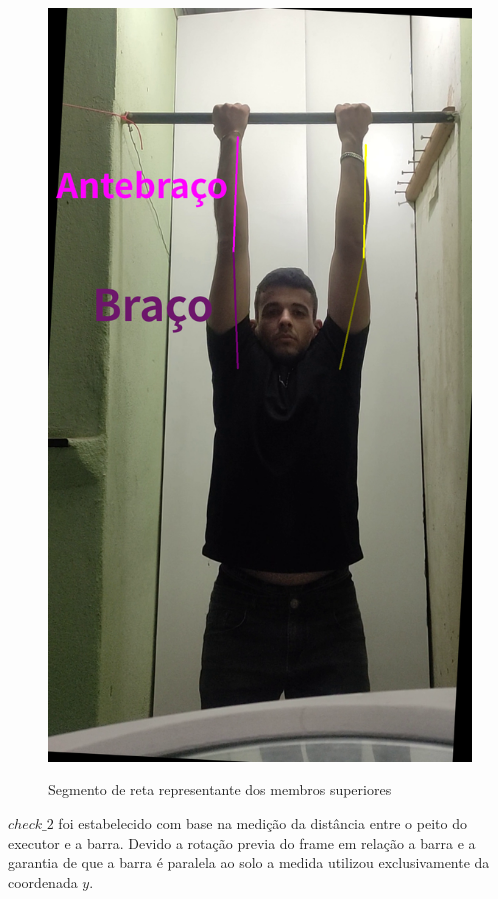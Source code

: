 \begin{figure}[H]
	\centering
    \caption{Segmento de reta representante dos membros superiores}
	\includegraphics[scale=0.2]{figuras/braco_esticado/82_braco_antebraco.png}
	\label{fig:braco_antebraco}
\end{figure}

$check\_2$ foi estabelecido com base na medição da distância entre o peito do executor e a barra. Devido a rotação previa do frame em relação a barra e a garantia de que a barra é paralela ao solo a medida utilizou exclusivamente da coordenada $y$.

